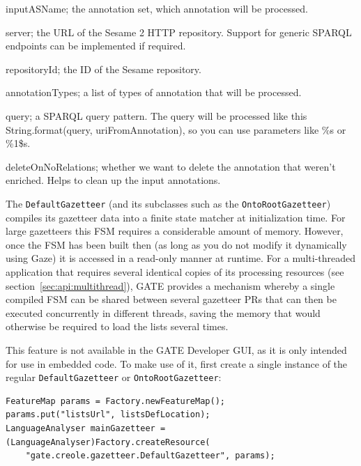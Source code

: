 \begin{plist}

\item{} inputASName; the annotation set, which annotation will be
processed.

\item{} server; the URL of the Sesame 2 HTTP repository. Support
for generic SPARQL endpoints can be implemented if required.

\item{} repositoryId; the ID of the Sesame repository.

\item{} annotationTypes; a list of types of annotation that will be
processed.

\item{} query; a SPARQL query pattern. The query will be processed
like this  String.format(query, uriFromAnnotation), so you can use
parameters like \%s or \%1\$s.

\item{} deleteOnNoRelations; whether we want to delete the
annotation that weren't enriched. Helps to clean up the input annotations.

\end{plist}




The \texttt{DefaultGazetteer} (and its subclasses such as the
\texttt{OntoRootGazetteer}) compiles its gazetteer data into a finite state
matcher at initialization time.  For large gazetteers this FSM requires a
considerable amount of memory.  However, once the FSM has been built then (as
long as you do not modify it dynamically using Gaze) it is accessed in a
read-only manner at runtime.  For a multi-threaded application that requires
several identical copies of its processing resources (see
section~\ref{sec:api:multithread}), GATE provides a mechanism whereby a
single compiled FSM can be shared between several gazetteer PRs that can then
be executed concurrently in different threads, saving the memory that would
otherwise be required to load the lists several times.

This feature is not available in the GATE Developer GUI, as it is only intended
for use in embedded code.  To make use of it, first create a single instance
of the regular \texttt{DefaultGazetteer} or \texttt{OntoRootGazetteer}:
%
\begin{small}\begin{verbatim}
FeatureMap params = Factory.newFeatureMap();
params.put("listsUrl", listsDefLocation);
LanguageAnalyser mainGazetteer = (LanguageAnalyser)Factory.createResource(
    "gate.creole.gazetteer.DefaultGazetteer", params);
\end{verbatim}\end{small}

